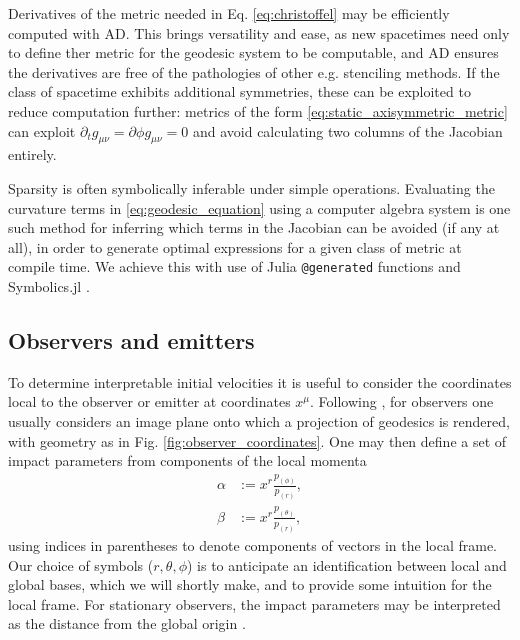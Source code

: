 Derivatives of the metric needed in Eq. \eqref{eq:christoffel} may be efficiently computed with AD. This brings versatility and ease, as new spacetimes need only to define ther metric for the geodesic system to be computable, and AD ensures the derivatives are free of the pathologies of other e.g. stenciling methods. If the class of spacetime exhibits additional symmetries, these can be exploited to reduce computation further: metrics of the form \eqref{eq:static_axisymmetric_metric} can exploit $\partial_t g_{\mu\nu} = \partial{\phi} g_{\mu\nu} = 0$ and avoid calculating two columns of the Jacobian entirely.

Sparsity is often symbolically inferable under simple operations. Evaluating the curvature terms in \eqref{eq:geodesic_equation} using a computer algebra system is one such method for inferring which terms in the Jacobian can be avoided (if any at all), in order to generate optimal expressions for a given class of metric at compile time. We achieve this with use of Julia \texttt{@generated} functions and Symbolics.jl \citep{}.

\subsection{Observers and emitters}

To determine interpretable initial velocities it is useful to consider the coordinates local to the observer or emitter at coordinates $x^\mu$. Following \cite{cunningham_optical_1973}, for observers one usually considers an image plane onto which a projection of geodesics is rendered, with geometry as in Fig. \ref{fig:observer_coordinates}. One may then define a set of impact parameters from components of the local momenta
\begin{align}
    \alpha &:=  x^r \frac{p_{(\phi)}}{p_{(r)}}, \\
    \beta &:= x^r \frac{p_{(\theta)}}{p_{(r)}},
\end{align}
using indices in parentheses to denote components of vectors in the local frame. Our choice of symbols ($r, \theta, \phi$) is to anticipate an identification between local and global bases, which we will shortly make, and to provide some intuition for the local frame.  For stationary observers, the impact parameters may be interpreted as the distance from the global origin .

